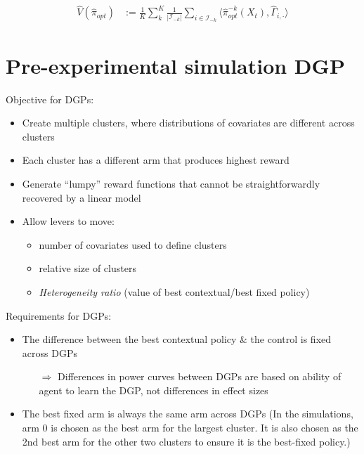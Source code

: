 \documentclass[letterpaper, 12pt, parskip=full,]{scrartcl}
\begin{document}
\begin{enumerate}
\begin{align*}
      \hat{V}(\hat{\pi}_{opt})  
					 &:= \frac{1}{K} \sum_{k}^K  \frac{1}{|\mathcal{I}_{-k}|} \sum_{i \in \mathcal{I}_{-k} }
          \langle \hat{\pi}_{opt}^{-k}(X_{t}), \hat{\Gamma}_{i, \cdot} \rangle
          \end{align*}
\end{enumerate}



\section{Pre-experimental simulation DGP}\label{appendix:dgp}

Objective for DGPs:
\begin{itemize}
    \item Create multiple clusters, where distributions of covariates are different across clusters
    \item Each cluster has a different arm that produces highest reward
    \item Generate ``lumpy'' reward functions that cannot be straightforwardly recovered by a linear model
    \item Allow levers to move:
    \begin{itemize}
        \item number of covariates used to define clusters
        \item relative size of clusters
        \item \textit{Heterogeneity ratio} (value of best contextual/best fixed policy)
    \end{itemize} 
\end{itemize}

Requirements for DGPs:
\begin{itemize}
    \item The difference between the best contextual policy \& the control is fixed across DGPs
    \begin{itemize}
        \item[$\Rightarrow$] Differences in power curves between DGPs are based on ability of agent to learn the DGP, not differences in effect sizes
    \end{itemize}
    \item The best fixed arm is always the same arm across DGPs (In the simulations, arm 0 is chosen as the best arm for the largest cluster. It is also chosen as the 2nd best arm for the other two clusters to ensure it is the best-fixed policy.)
\end{itemize}
\end{document}
